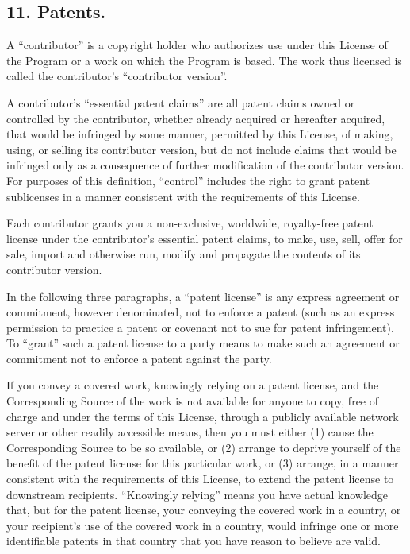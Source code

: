 \subsection{11. Patents.}
A “contributor” is a copyright holder who authorizes use under this License of the Program or a work on which the Program is based. The work thus licensed is called the contributor's “contributor version”.\par
A contributor's “essential patent claims” are all patent claims owned or controlled by the contributor, whether already acquired or hereafter acquired, that would be infringed by some manner, permitted by this License, of making, using, or selling its contributor version, but do not include claims that would be infringed only as a consequence of further modification of the contributor version. For purposes of this definition, “control” includes the right to grant patent sublicenses in a manner consistent with the requirements of this License.\par
Each contributor grants you a non-exclusive, worldwide, royalty-free patent license under the contributor's essential patent claims, to make, use, sell, offer for sale, import and otherwise run, modify and propagate the contents of its contributor version.\par
In the following three paragraphs, a “patent license” is any express agreement or commitment, however denominated, not to enforce a patent (such as an express permission to practice a patent or covenant not to sue for patent infringement). To “grant” such a patent license to a party means to make such an agreement or commitment not to enforce a patent against the party.\par
If you convey a covered work, knowingly relying on a patent license, and the Corresponding Source of the work is not available for anyone to copy, free of charge and under the terms of this License, through a publicly available network server or other readily accessible means, then you must either (1) cause the Corresponding Source to be so available, or (2) arrange to deprive yourself of the benefit of the patent license for this particular work, or (3) arrange, in a manner consistent with the requirements of this License, to extend the patent license to downstream recipients. “Knowingly relying” means you have actual knowledge that, but for the patent license, your conveying the covered work in a country, or your recipient's use of the covered work in a country, would infringe one or more identifiable patents in that country that you have reason to believe are valid.\par
